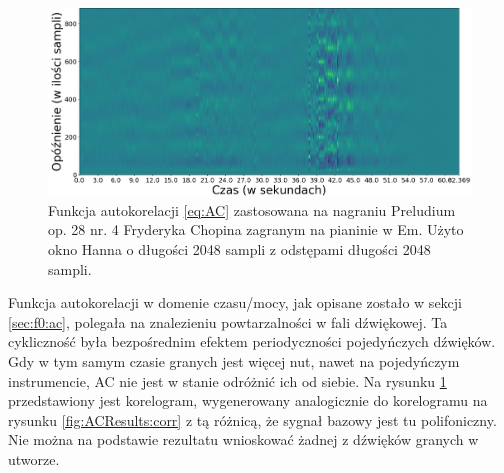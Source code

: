 \documentclass[12pt,a4paper,twoside]{mwart}
\begin{document}
\begin{figure}[ht]
  \begin{center}
    \includegraphics[scale=0.38]{images/AC/korelogram_multif0_cropped.png}
    \caption{Funkcja autokorelacji \ref{eq:AC} zastosowana na nagraniu Preludium op. 28 nr. 4 Fryderyka Chopina zagranym na pianinie w Em. Użyto okno Hanna o długości 2048 sampli z odstępami długości 2048 sampli.}
    \label{fig:multi:ac}
  \end{center}
\end{figure}

Funkcja autokorelacji w domenie czasu/mocy, jak opisane zostało w sekcji \ref{sec:f0:ac}, polegała na znalezieniu powtarzalności w fali dźwiękowej. Ta cykliczność była bezpośrednim efektem periodyczności pojedyńczych dźwięków. Gdy w tym samym czasie granych jest więcej nut, nawet na pojedyńczym instrumencie, AC nie jest w stanie odróżnić ich od siebie. Na rysunku \ref{fig:multi:ac} przedstawiony jest korelogram, wygenerowany analogicznie do korelogramu na rysunku \ref{fig:ACResults:corr} z tą różnicą, że sygnał bazowy jest tu polifoniczny.  Nie można na podstawie rezultatu wnioskować żadnej z dźwięków granych w utworze.
\end{document}
